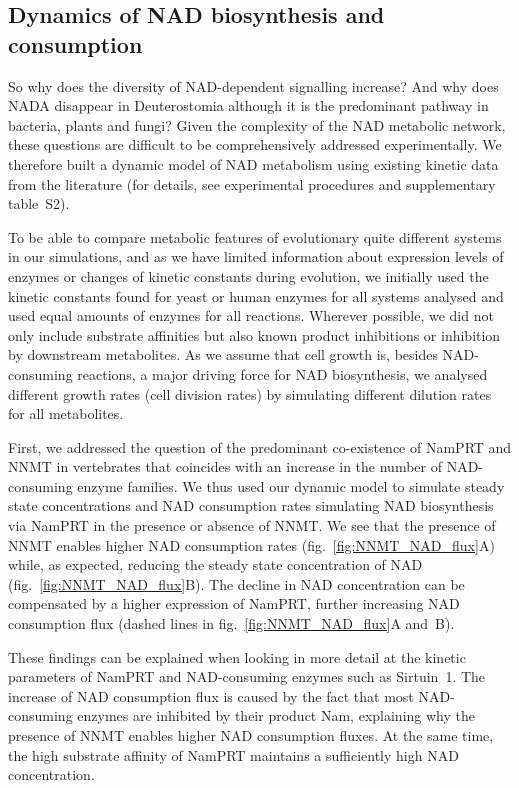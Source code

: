 \subsection{Dynamics of NAD biosynthesis and consumption}

So why does the diversity of NAD-dependent signalling increase? And why does NADA disappear in Deuterostomia although it is the predominant pathway in bacteria, plants and fungi? Given the complexity of the NAD metabolic network, these questions are difficult to be comprehensively addressed experimentally. We therefore built a dynamic model of NAD metabolism using existing kinetic data from the literature (for details, see experimental procedures and supplementary table~S2).

To be able to compare metabolic features of evolutionary quite different systems in our simulations, and as we have limited information about expression levels of enzymes or changes of kinetic constants during evolution, we initially used the kinetic constants found for yeast or human enzymes for all systems analysed and used equal amounts of enzymes for all reactions. Wherever possible, we did not only include substrate affinities but also known product inhibitions or inhibition by downstream metabolites. As we assume that cell growth is, besides NAD-consuming reactions, a major driving force for NAD biosynthesis, we analysed different growth rates (cell division rates) by simulating different dilution rates for all metabolites.

First, we addressed the question of the predominant co-existence of NamPRT and NNMT in vertebrates that coincides with an increase in the number of NAD-consuming enzyme families. We thus used our dynamic model to simulate steady state concentrations and NAD consumption rates simulating NAD biosynthesis via NamPRT in the presence or absence of NNMT. We see that the presence of NNMT enables higher NAD consumption rates (fig.~\ref{fig:NNMT_NAD_flux}A) while, as expected, reducing the steady state concentration of NAD (fig.~\ref{fig:NNMT_NAD_flux}B). The decline in NAD concentration can be compensated by a higher expression of NamPRT, further increasing NAD consumption flux (dashed lines in fig.~\ref{fig:NNMT_NAD_flux}A and~B).

These findings can be explained when looking in more detail at the kinetic parameters of NamPRT and NAD-consuming enzymes such as Sirtuin~1. The increase of NAD consumption flux is caused by the fact that most NAD-consuming enzymes are inhibited by their product Nam, explaining why the presence of NNMT enables higher NAD consumption fluxes. At the same time, the high substrate affinity of NamPRT maintains a sufficiently high NAD concentration.

